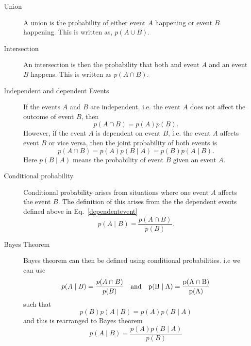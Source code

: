 \begin{description}
	\item [Union]
	A union is the probability of either event $A$ happening or event $B$ happening. This is written as, $p(A \cup B)$.
	
	\item [Intersection]
	An intersection is then the probability that both and event $A$ and an event $B$ happens. This is written as $p(A \cap B)$.
	
	\item [Independent and dependent Events]
	If the events $A$ and $B$ are independent, i.e. the event $A$ does not affect the outcome of event $B$, then
	\begin{equation}
	p(A \cap B) = p(A)p(B).
	\end{equation}
	However, if the event $A$ is dependent on event $B$, i.e. the event $A$ affects event $B$ or vice versa, then the joint probability of both events is
	\begin{equation}
	\label{dependentevent}
	p(A \cap B) = p(A)p(B \mid A) = p(B)p(A \mid B).
	\end{equation}
	Here $p(B \mid A)$ means the probability of event $B$ given an event $A$.
	
	\item [Conditional probability]
	Conditional probability arises from situations where one event $A$ affects the event $B$.
	The definition of this arises from the the dependent events defined above in Eq.~\ref{dependentevent}
	\begin{equation}
	p(A \mid B) = \frac{p(A \cap B)}{p(B)}.
	\end{equation}
	
	\item [Bayes Theorem]
	Bayes theorem can then be defined using conditional probabilities. i.e we can use
	\begin{equation}
	p(A \mid B) = \frac{p(A \cap B)}{p(B)} \quad \rm{and} \quad p(B \mid A) = \frac{p(A \cap B)}{p(A)}
	\end{equation}
	such that
	\begin{equation}
	p(B)p(A \mid B) = p(A)p(B \mid A)
	\end{equation}
	and this is rearranged to Bayes theorem
	\begin{equation}
	p(A \mid B) = \frac{p(A)p(B \mid A)}{p(B)}
	\end{equation}
	
\end{description}

